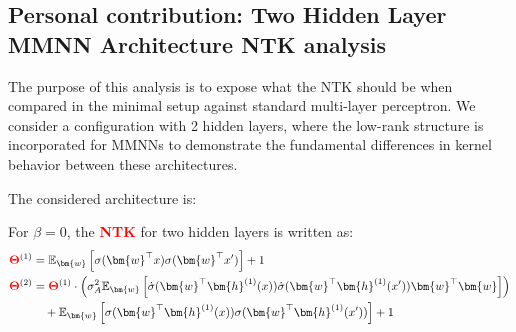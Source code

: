 \documentclass[a4paper]{article}
\theoremstyle{plain}
\theoremstyle{definition}
\theoremstyle{remark}
\begin{document}
\subsection{Personal contribution: Two Hidden Layer MMNN Architecture NTK analysis}
\begin{tcolorbox}[colback=green!15,colframe=green!80!black,title={\textbf{Objective: Comparative Analysis of MMNN vs Standard MLP}},enhanced,drop shadow,boxrule=2pt]
The purpose of this analysis is to expose what the NTK should be when compared in the minimal setup against standard multi-layer perceptron. We consider a configuration with 2 hidden layers, where the low-rank structure is incorporated for MMNNs to demonstrate the fundamental differences in kernel behavior between these architectures.
\end{tcolorbox}

The considered architecture is:
\begin{center}
\end{center}
\begin{tcolorbox}[colback=personalcontribcolor!10,colframe=personalcontribcolor,title={\textbf{Main Formula: Two Layer MMNN NTK}},enhanced,drop shadow]
For $\beta = 0$, the \textcolor{red}{\textbf{NTK}} for two hidden layers is written as:
\begin{align}
\textcolor{red}{\boldsymbol{\Theta}}^{(1)} &= \mathbb{E}_{\bm{w}} \left[ \sigma(\bm{w}^\top x) \sigma(\bm{w}^\top x') \right] + 1 \\
\textcolor{red}{\boldsymbol{\Theta}}^{(2)} &= \textcolor{red}{\boldsymbol{\Theta}}^{(1)} \cdot \left(\sigma_A^2 \mathbb{E}_{\bm{w}} \left[ \dot{\sigma}(\bm{w}^\top \bm{h}^{(1)}(x)) \dot{\sigma}(\bm{w}^\top \bm{h}^{(1)}(x')) \bm{w}^\top\bm{w} \right]\right) \nonumber\\
&\quad + \mathbb{E}_{\bm{w}} \left[ \sigma(\bm{w}^\top \bm{h}^{(1)}(x)) \sigma(\bm{w}^\top \bm{h}^{(1)}(x')) \right] + 1
\end{align}
\end{tcolorbox}
\end{document}
